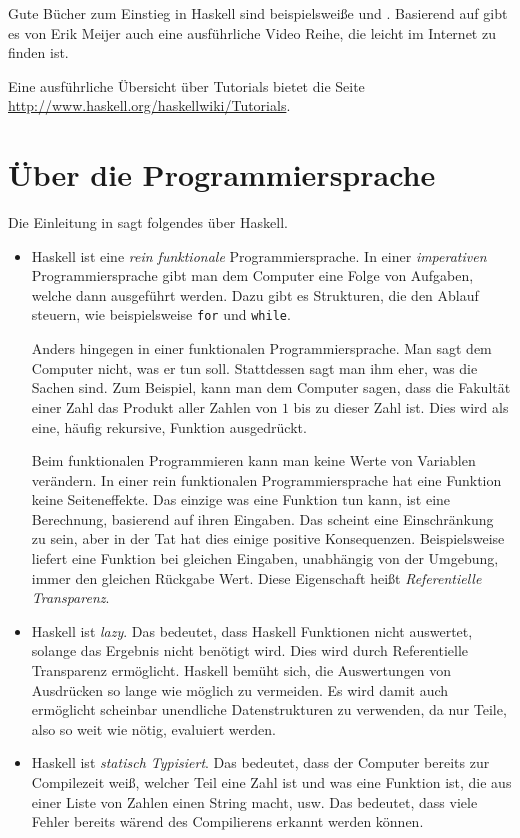 Gute Bücher zum Einstieg in Haskell sind beispielsweiße \cite{Hutton} und
\cite{lyahfgg}. Basierend auf \cite{Hutton} gibt es von Erik Meijer auch eine
ausführliche Video Reihe, die leicht im Internet zu finden ist.

Eine ausführliche Übersicht über Tutorials bietet die Seite
\url{http://www.haskell.org/haskellwiki/Tutorials}.

\section{Über die Programmiersprache}
Die Einleitung in \cite{lyahfgg} sagt folgendes über Haskell.

\begin{itemize}
  \item 
Haskell ist eine \emph{rein funktionale} Programmiersprache.
In einer \emph{imperativen} Programmiersprache gibt man dem Computer eine Folge
von Aufgaben, welche dann ausgeführt werden.  Dazu gibt es Strukturen, die den
Ablauf steuern, wie beispielsweise \texttt{for} und \texttt{while}.

Anders hingegen in einer funktionalen Programmiersprache. Man sagt dem Computer
nicht, was er tun soll. Stattdessen sagt man ihm eher, was die Sachen sind.
Zum Beispiel, kann man dem Computer sagen, dass die Fakultät einer Zahl das
Produkt aller Zahlen von $1$ bis zu dieser Zahl ist.
Dies wird als eine, häufig rekursive, Funktion ausgedrückt.

Beim funktionalen Programmieren kann man keine Werte von Variablen verändern.
In einer rein funktionalen Programmiersprache hat eine Funktion keine
Seiteneffekte. Das einzige was eine Funktion tun kann, ist eine Berechnung,
basierend auf ihren Eingaben. Das scheint eine Einschränkung zu sein, aber in
der Tat hat dies einige positive Konsequenzen. Beispielsweise liefert eine
Funktion bei gleichen Eingaben, unabhängig von der Umgebung, immer den gleichen
Rückgabe Wert. Diese Eigenschaft heißt \emph{Referentielle Transparenz}.

  \item 
Haskell ist \emph{lazy}.
Das bedeutet, dass Haskell Funktionen nicht auswertet, solange das Ergebnis
nicht benötigt wird. Dies wird durch Referentielle Transparenz ermöglicht.
Haskell bemüht sich, die Auswertungen von Ausdrücken so lange wie möglich zu
vermeiden.
Es wird damit auch ermöglicht scheinbar unendliche Datenstrukturen zu
verwenden, da nur Teile, also so weit wie nötig, evaluiert werden.

  \item 
Haskell ist \emph{statisch Typisiert}.
Das bedeutet, dass der Computer bereits zur Compilezeit weiß, welcher Teil eine
Zahl ist und was eine Funktion ist, die aus einer Liste von Zahlen einen String
macht, usw. Das bedeutet, dass viele Fehler bereits wärend des Compilierens
erkannt werden können.


\end{itemize}
